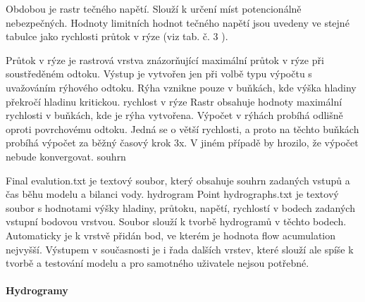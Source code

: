 Obdobou je rastr tečného napětí. Slouží k určení míst potencionálně nebezpečných. Hodnoty limitních hodnot tečného napětí jsou uvedeny ve stejné tabulce jako rychlosti průtok v rýze (viz tab. č. 3 ).

Průtok v rýze je rastrová vrstva znázorňující maximální průtok v rýze při soustředěném odtoku. Výstup je vytvořen jen při volbě typu výpočtu s uvažováním rýhového odtoku. Rýha vznikne pouze v buňkách, kde výška hladiny překročí hladinu kritickou. 
rychlost v rýze
Rastr obsahuje hodnoty maximální rychlosti v buňkách, kde je rýha vytvořena. Výpočet v rýhách probíhá odlišně oproti povrchovému odtoku. Jedná se o větší rychlosti, a proto na těchto buňkách probíhá výpočet za běžný časový krok 3x. V jiném případě by hrozilo, že výpočet nebude konvergovat.
souhrn

Final evalution.txt je textový soubor, který obsahuje souhrn zadaných vstupů a čas běhu modelu a bilanci vody. 
hydrogram
Point hydrographs.txt je textový soubor s hodnotami výšky hladiny, průtoku, napětí, rychlostí v bodech zadaných vstupní bodovou vrstvou. Soubor slouží k tvorbě hydrogramů v těchto bodech. Automaticky je k vrstvě přidán bod, ve kterém je hodnota flow acumulation nejvyšší.
Výstupem v současnosti je i řada dalších vrstev, které slouží ale spíše k tvorbě a testování modelu a pro samotného uživatele nejsou potřebné.	


\paragraph{Hydrogramy} \label{sec:hydrogramy}




